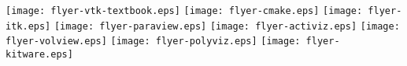 \newpage
\newpage
\thispagestyle{empty}
\texttt{[image: flyer-vtk-textbook.eps]}
\newpage
\thispagestyle{empty}
\texttt{[image: flyer-cmake.eps]}
\newpage
\thispagestyle{empty}
\texttt{[image: flyer-itk.eps]}
\newpage
\thispagestyle{empty}
\texttt{[image: flyer-paraview.eps]}
\newpage
\thispagestyle{empty}
\texttt{[image: flyer-activiz.eps]}
\newpage
\thispagestyle{empty}
\texttt{[image: flyer-volview.eps]}
\newpage
\thispagestyle{empty}
\texttt{[image: flyer-polyviz.eps]}
\newpage
\thispagestyle{empty}
\texttt{[image: flyer-kitware.eps]}

